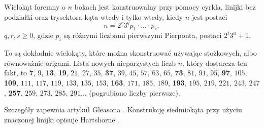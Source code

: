 \begin{proposition}
    Wielokąt foremny o $n$ bokach jest konstruowalny przy pomocy cyrkla, linijki bez podziałki oraz trysektora kąta wtedy i tylko wtedy, kiedy $n$ jest postaci
    \begin{equation}
        n = 2^r 3^q p_1 \cdot \ldots \cdot p_s,
    \end{equation}
    $q, r, s \ge 0$, gdzie $p_i$ są różnymi liczbami pierwszymi Pierponta, postaci $2^t3^u + 1$.
\end{proposition}

To są dokładnie wielokąty, które można skonstruować używając stożkowych, albo równoważnie origami.
Lista nowych nieparzystych liczb $n$, który dostarcza ten fakt, to \textbf{7}, $9$, \textbf{13}, \textbf{19}, $21$, $27$, $35$, \textbf{37}, $39$, $45$, $57$, $63$, $65$, \textbf{73}, $81$, $91$, $95$, \textbf{97}, $105$, \textbf{109}, $111$, $117$, $119$, $133$, $135$, $153$, \textbf{163}, $171$, $185$, $189$, \textbf{193}, $195$, $219$, $221$, $243$, $247$, \textbf{257}, $259$, $273$, $285$, $291\ldots$ (pogrubiono liczby pierwsze).

Szczegóły zapewnia artykuł Gleasona \cite{gleason_1988}.
%
Konstrukcję siedmiokąta przy użyciu znaczonej linijki opisuje Hartshorne .

